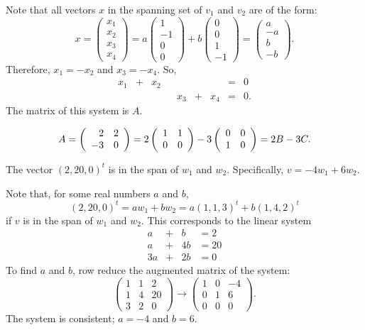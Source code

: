 \soln Note that all vectors $x$ in the spanning set of $v_1$ and $v_2$
are of the form:
\[
x = \left(\begin{array}{r} x_1 \\ x_2 \\ x_3 \\ x_4
\end{array}\right)
= a\left(\begin{array}{r} 1 \\ -1 \\ 0 \\ 0 \end{array}\right) + 
b\left(\begin{array}{r} 0 \\ 0 \\ 1 \\ -1 \end{array}\right) =
\left(\begin{array}{r} a \\ -a \\ b \\ -b \end{array}\right).
\]
Therefore, $x_1 = -x_2$ and $x_3 = -x_4$.  So,
\[
\begin{array}{rrrrrrrrl}
x_1 & + & x_2 & & & & & = & 0 \\
& & & & x_3 & + & x_4 & = & 0. \end{array}
\]
The matrix of this system is $A$.

\[ A = \left(\begin{array}{rr} 2 & 2\\ -3 &0\end{array}\right) = 2\left(\begin{array}{rr} 1 & 1\\ 0 &0\end{array}\right) -
3\left(\begin{array}{rr} 0 & 0\\ 1 &0\end{array}\right) = 2B - 3C. \]

\ans The vector $(2,20,0)^t$ is in the span of $w_1$ and $w_2$. 
Specifically, $v = -4w_1 + 6w_2$.

\soln Note that, for some real numbers $a$ and $b$,
\[
(2,20,0)^t = aw_1 + bw_2 = a(1,1,3)^t + b(1,4,2)^t
\]
if $v$ is in the span of $w_1$ and $w_2$.
This corresponds to the linear system
\[
\begin{array}{rrrrr}
a & + & b & = 2 \\
a & + & 4b & = 20 \\
3a & + & 2b & = 0 \end{array}
\]
To find $a$ and $b$, row reduce the augmented matrix of the system:
\[
\left(\begin{array}{rr|r} 1 & 1 & 2 \\ 1 & 4 & 20 \\
3 & 2 & 0 \end{array}\right) \longrightarrow
\left(\begin{array}{rr|r} 1 & 0 & -4 \\ 0 & 1 & 6 \\
0 & 0 & 0 \end{array}\right).
\]
The system is consistent; $a = -4$ and $b = 6$.

